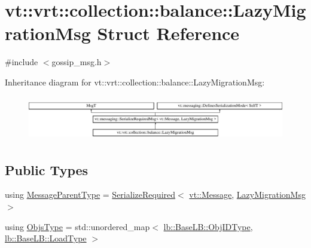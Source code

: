 \hypertarget{structvt_1_1vrt_1_1collection_1_1balance_1_1_lazy_migration_msg}{}\section{vt\+:\+:vrt\+:\+:collection\+:\+:balance\+:\+:Lazy\+Migration\+Msg Struct Reference}
\label{structvt_1_1vrt_1_1collection_1_1balance_1_1_lazy_migration_msg}


{\ttfamily \#include $<$gossip\+\_\+msg.\+h$>$}

Inheritance diagram for vt\+:\+:vrt\+:\+:collection\+:\+:balance\+:\+:Lazy\+Migration\+Msg\+:\begin{figure}[H]
\begin{center}
\leavevmode
\includegraphics[height=1.962617cm]{structvt_1_1vrt_1_1collection_1_1balance_1_1_lazy_migration_msg}
\end{center}
\end{figure}
\subsection*{Public Types}
\begin{DoxyCompactItemize}
\item 
using \hyperlink{structvt_1_1vrt_1_1collection_1_1balance_1_1_lazy_migration_msg_ae85922f15b423b53083cccda06ef0b45}{Message\+Parent\+Type} = \hyperlink{namespacevt_a9e60e2e8929828639383ac1d6643384d}{Serialize\+Required}$<$ \hyperlink{namespacevt_a3a3ddfef40b4c90915fa43cdd5f129ea}{vt\+::\+Message}, \hyperlink{structvt_1_1vrt_1_1collection_1_1balance_1_1_lazy_migration_msg}{Lazy\+Migration\+Msg} $>$
\item 
using \hyperlink{structvt_1_1vrt_1_1collection_1_1balance_1_1_lazy_migration_msg_a8d71e0015ee1e05da54701cae56ef31c}{Objs\+Type} = std\+::unordered\+\_\+map$<$ \hyperlink{structvt_1_1vrt_1_1collection_1_1lb_1_1_base_l_b_a790b22acf448880599724749cdc4e9b3}{lb\+::\+Base\+L\+B\+::\+Obj\+I\+D\+Type}, \hyperlink{structvt_1_1vrt_1_1collection_1_1lb_1_1_base_l_b_a215e22b9f12678303f49615ae3be05cc}{lb\+::\+Base\+L\+B\+::\+Load\+Type} $>$
\end{DoxyCompactItemize}
